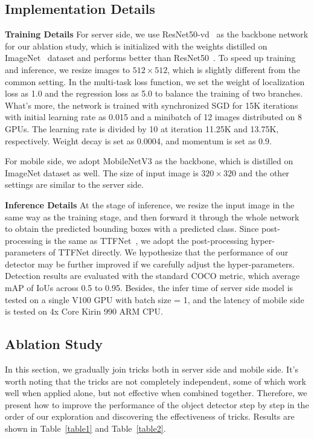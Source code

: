 \documentclass[10pt,twocolumn,letterpaper]{article}
\begin{document}
    \subsection{Implementation Details}
{\bf Training Details} For server side, we use ResNet50-vd~\cite{yu20201st} as the backbone network for our ablation study, which is initialized with the weights distilled on ImageNet~\cite{deng2009imagenet} dataset and performs better than ResNet50~\cite{akiba2017extremely}. To speed up training and inference, we resize images to  ${512 \times 512}$, which is slightly different from the common setting. In the multi-task loss function, we set the weight of localization loss as 1.0 and the regression loss as 5.0 to balance the training of two branches. What's more, the network is trained with synchronized SGD for 15K iterations with initial learning rate as 0.015 and a minibatch of 12 images distributed on 8 GPUs. The learning rate is divided by 10 at iteration 11.25K and 13.75K, respectively. Weight decay is set as 0.0004, and momentum is set as 0.9.

    For mobile side, we adopt MobileNetV3 as the backbone, which is distilled on ImageNet dataset as well. The size of input image is ${320 \times 320}$ and the other settings are similar to the server side.
    
{\bf Inference Details} 
    At the stage of inference, we resize the input image in the same way as the training stage, and then forward it through the whole network to obtain the predicted bounding boxes with a predicted class. Since post-processing is the same as TTFNet~\cite{liu2020training}, we adopt the post-processing hyper-parameters of TTFNet directly. We hypothesize that the performance of our detector may be further improved if we carefully adjust the hyper-parameters. Detection results are evaluated with the standard COCO metric, which average mAP of IoUs across 0.5 to 0.95. Besides, the infer time of server side model is tested on a single V100 GPU with batch size = 1, and the latency of mobile side is tested on 4x Core Kirin 990 ARM CPU. 
    
    
    \subsection{Ablation Study}
In this section,  we gradually join tricks both in server side and mobile side. It's worth noting that the tricks are not completely independent, some of which work well when applied alone, but not effective when combined together. Therefore, we present how to improve the performance of the object detector step by step in the order of our exploration and discovering the effectiveness of tricks. Results are shown in Table~\ref{table1} and Table~\ref{table2}.
    
\end{document}
